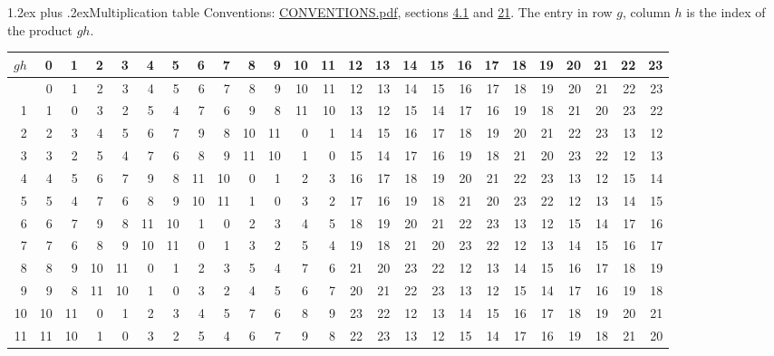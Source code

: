 \documentclass[10pt,a4paper]{article}
\makeatletter
\renewcommand\section{\@startsection{section}{1}{\z@}{-3ex plus -1ex minus -.2ex}%
  {1.2ex plus .2ex}{\normalfont\large\sffamily\bfseries\color{parttitle}}}
\numberwithin{equation}{section}
\makeatother
\begin{document}
\section{Multiplication table}\label{s:multiplication}
Conventions: \href{../../CONVENTIONS.pdf}{CONVENTIONS.pdf}, sections \href{../../../rotation/CONVENTIONS.pdf\#conv.4.1}{4.1} and \href{../../CONVENTIONS.pdf\#conv.21}{21}.
The entry in row $g$, column $h$ is the index of the product $gh$.
{\normalsize\setlength{\tabcolsep}{0.1em}\setlength{\LTleft}{-8pt plus 1fill}\setlength{\LTright}{-8pt plus 1fill}\begin{longtable}{@{}r|rrrrrrrrrrrrrrrrrrrrrrrr@{}}\toprule
$gh$ & 0 & 1 & 2 & 3 & 4 & 5 & 6 & 7 & 8 & 9 & 10 & 11 & 12 & 13 & 14 & 15 & 16 & 17 & 18 & 19 & 20 & 21 & 22 & 23\\\midrule\endhead
\bottomrule\endfoot\endlastfoot
0 & 0 & 1 & 2 & 3 & 4 & 5 & 6 & 7 & 8 & 9 & 10 & 11 & 12 & 13 & 14 & 15 & 16 & 17 & 18 & 19 & 20 & 21 & 22 & 23\\*
1 & 1 & 0 & 3 & 2 & 5 & 4 & 7 & 6 & 9 & 8 & 11 & 10 & 13 & 12 & 15 & 14 & 17 & 16 & 19 & 18 & 21 & 20 & 23 & 22\\
2 & 2 & 3 & 4 & 5 & 6 & 7 & 9 & 8 & 10 & 11 & 0 & 1 & 14 & 15 & 16 & 17 & 18 & 19 & 20 & 21 & 22 & 23 & 13 & 12\\
3 & 3 & 2 & 5 & 4 & 7 & 6 & 8 & 9 & 11 & 10 & 1 & 0 & 15 & 14 & 17 & 16 & 19 & 18 & 21 & 20 & 23 & 22 & 12 & 13\\
4 & 4 & 5 & 6 & 7 & 9 & 8 & 11 & 10 & 0 & 1 & 2 & 3 & 16 & 17 & 18 & 19 & 20 & 21 & 22 & 23 & 13 & 12 & 15 & 14\\
5 & 5 & 4 & 7 & 6 & 8 & 9 & 10 & 11 & 1 & 0 & 3 & 2 & 17 & 16 & 19 & 18 & 21 & 20 & 23 & 22 & 12 & 13 & 14 & 15\\
6 & 6 & 7 & 9 & 8 & 11 & 10 & 1 & 0 & 2 & 3 & 4 & 5 & 18 & 19 & 20 & 21 & 22 & 23 & 13 & 12 & 15 & 14 & 17 & 16\\
7 & 7 & 6 & 8 & 9 & 10 & 11 & 0 & 1 & 3 & 2 & 5 & 4 & 19 & 18 & 21 & 20 & 23 & 22 & 12 & 13 & 14 & 15 & 16 & 17\\
8 & 8 & 9 & 10 & 11 & 0 & 1 & 2 & 3 & 5 & 4 & 7 & 6 & 21 & 20 & 23 & 22 & 12 & 13 & 14 & 15 & 16 & 17 & 18 & 19\\
9 & 9 & 8 & 11 & 10 & 1 & 0 & 3 & 2 & 4 & 5 & 6 & 7 & 20 & 21 & 22 & 23 & 13 & 12 & 15 & 14 & 17 & 16 & 19 & 18\\
10 & 10 & 11 & 0 & 1 & 2 & 3 & 4 & 5 & 7 & 6 & 8 & 9 & 23 & 22 & 12 & 13 & 14 & 15 & 16 & 17 & 18 & 19 & 20 & 21\\
11 & 11 & 10 & 1 & 0 & 3 & 2 & 5 & 4 & 6 & 7 & 9 & 8 & 22 & 23 & 13 & 12 & 15 & 14 & 17 & 16 & 19 & 18 & 21 & 20\\

\end{longtable}}
\end{document}

